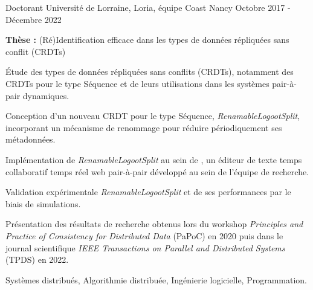 
\begin{cventries}

\cventry
    {Doctorant}
    {Université de Lorraine, Loria, équipe Coast}
    {Nancy}
    {Octobre 2017 - Décembre 2022}
    {}

\vspace{-1.5em}
\begin{cvparagraph}
    \textbf{Thèse :} (Ré)Identification efficace dans les types de données répliquées sans conflit (CRDTs)

    \medskip
    \begin{cvitems} %
        \item Étude des types de données répliquées sans conflits (CRDTs), notamment des CRDTs pour le type Séquence et de leurs utilisations dans les systèmes pair-à-pair dynamiques.
        \item Conception d'un nouveau CRDT pour le type Séquence, \emph{RenamableLogootSplit}, incorporant  un mécanisme de renommage pour réduire périodiquement ses métadonnées.
        \item Implémentation de \emph{RenamableLogootSplit} au sein de , un éditeur de texte temps collaboratif temps réel web pair-à-pair développé au sein de l'équipe de recherche.
        \item Validation expérimentale \emph{RenamableLogootSplit} et de ses performances par le biais de simulations.
        \item Présentation des résultats de recherche obtenus lors du workshop \emph{Principles and Practice of Consistency for Distributed Data} (PaPoC) en 2020 puis dans le journal scientifique \emph{IEEE Transactions on Parallel and Distributed Systems} (TPDS) en 2022.
    \end{cvitems}

    \bigskip
    \begin{description}[labelindent=1.6em,itemsep=-0.3em]
        \item {}
        \item {}
    \end{description}

    \medskip
     Systèmes distribués, Algorithmie distribuée, Ingénierie logicielle, Programmation.
\end{cvparagraph}


\end{cventries}
